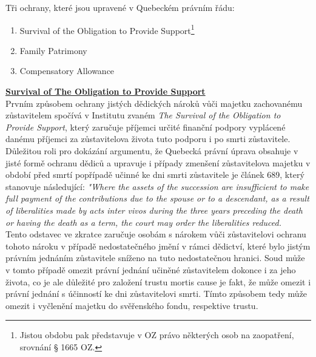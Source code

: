 \documentclass{article}
\begin{document}
Tři ochrany, které jsou upravené v Quebeckém právním řádu:

\begin{enumerate}
\item Survival of the Obligation to Provide Support\footnote{Jistou obdobu pak představuje v OZ právo některých osob na zaopatření, srovnání § 1665 OZ.}
\item Family Patrimony
\item Compensatory Allowance	
\end{enumerate}

\vspace{5 mm}

\underline{\textbf{Survival of The Obligation to Provide Support}}\\

Prvním způsobem ochrany jistých dědických nároků vůči majetku zachované\-mu zůstavitelem spočívá v Institutu zvaném \textit{The Survival of the Obligation to Provide Support}, který zaručuje příjemci určité finanční podpory vyplácené danému příjemci za zůstavitelova života tuto podporu i po smrti zůstavitele. \\

Důležitou roli pro dokázání argumentu, že Quebecká právní úprava obsahuje v jisté formě ochranu dědiců a upravuje i případy zmenšení zůstavitelova majetku v období před smrtí popřípadě učinné ke dni smrti zůstavitele je článek 689, který stanovuje následující: \textit{"Where the assets of the succession are insufficient to make full payment of the contributions due to the spouse or to a descendant, as a result of liberalities made by acts inter vivos during the three years preceding the death or having the death as a term, the court may order the liberalities reduced.}\\ 

Tento odstavec ve zkratce zaručuje osobám s nárokem vůči zůstavitelovi ochranu tohoto nároku v případě nedostatečného jmění v rámci dědictví, které bylo jistým právním jednáním zůstavitele sníženo na tuto nedostatečnou hranici. Soud může v tomto případě omezit právní jednání učiněné zůstavitelem dokonce i za jeho života, co je ale důležité pro založení trustu mortis cause je fakt, že může omezit i právní jednání s účinností ke dni zůstavitelovi smrti. Tímto způsobem tedy může omezit i vyčlenění majetku do svěřenského fondu, respektive trustu. \\
\end{document}
